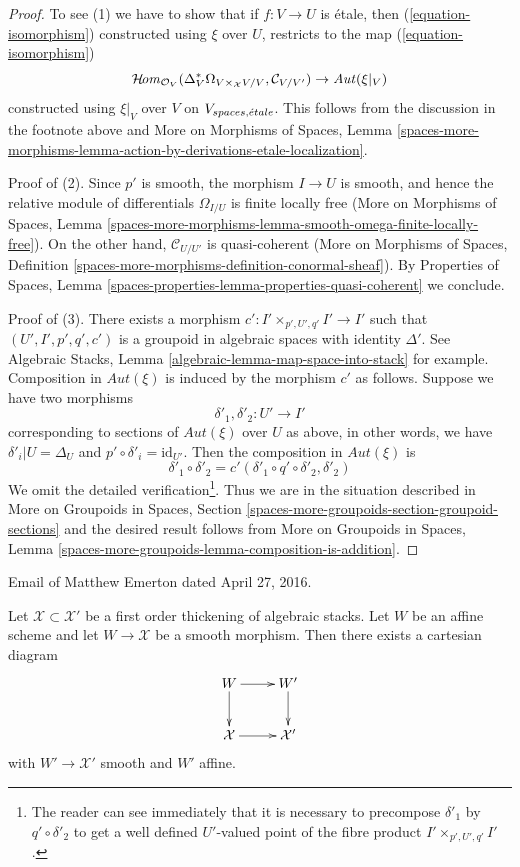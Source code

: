 \begin{proof}
\medskip\noindent
To see (1) we have to show that if $f : V \to U$ is \'etale,
then (\ref{equation-isomorphism}) constructed using $\xi$ over $U$,
restricts to the map (\ref{equation-isomorphism})
$$
\mathop{\mathcal{H}\!\mathit{om}}\nolimits_{\mathcal{O}_V}(
\Delta_V^*\Omega_{V \times_\mathcal{X} V/V}, \mathcal{C}_{V/V'}) \to
\mathit{Aut}(\xi|_V)
$$
constructed using $\xi|_V$ over $V$ on $V_{spaces, {\acute{e}tale}}$.
This follows from the discussion in the footnote above
and More on Morphisms of Spaces, Lemma
\ref{spaces-more-morphisms-lemma-action-by-derivations-etale-localization}.

\medskip\noindent
Proof of (2). Since $p'$ is smooth, the morphism $I \to U$ is smooth,
and hence the relative module of differentials $\Omega_{I/U}$
is finite locally free (More on Morphisms of Spaces, Lemma
\ref{spaces-more-morphisms-lemma-smooth-omega-finite-locally-free}).
On the other hand, $\mathcal{C}_{U/U'}$ is quasi-coherent
(More on Morphisms of Spaces, Definition
\ref{spaces-more-morphisms-definition-conormal-sheaf}).
By Properties of Spaces, Lemma
\ref{spaces-properties-lemma-properties-quasi-coherent}
we conclude.

\medskip\noindent
Proof of (3). There exists a morphism $c' : I' \times_{p', U', q'} I' \to I'$
such that $(U', I', p', q', c')$ is a groupoid in algebraic spaces
with identity $\Delta'$. See
Algebraic Stacks, Lemma \ref{algebraic-lemma-map-space-into-stack} for example.
Composition in $\mathit{Aut}(\xi)$ is induced by the morphism
$c'$ as follows. Suppose we have two morphisms
$$
\delta'_1, \delta'_2 : U' \longrightarrow I'
$$
corresponding to sections of $\mathit{Aut}(\xi)$ over $U$ as above,
in other words, we have $\delta'_i|U = \Delta_U$ and
$p' \circ \delta'_i = \text{id}_{U'}$. Then the composition
in $\mathit{Aut}(\xi)$ is
$$
\delta'_1 \circ \delta'_2 = c'(\delta'_1 \circ q' \circ \delta'_2, \delta'_2)
$$
We omit the detailed verification\footnote{The reader can see immediately
that it is necessary to precompose
$\delta'_1$ by $q' \circ \delta'_2$ to get a well defined $U'$-valued
point of the fibre product $I' \times_{p', U', q'} I'$.}.
Thus we are in the situation described in
More on Groupoids in Spaces, Section
\ref{spaces-more-groupoids-section-groupoid-sections}
and the desired result follows from
More on Groupoids in Spaces, Lemma
\ref{spaces-more-groupoids-lemma-composition-is-addition}.
\end{proof}

\begin{proposition}[Emerton]
\label{proposition-affine-smooth-lift-to-first-order}
\begin{reference}
Email of Matthew Emerton dated April 27, 2016.
\end{reference}
Let $\mathcal{X} \subset \mathcal{X}'$ be a first order thickening
of algebraic stacks. Let $W$ be an affine scheme and let
$W \to \mathcal{X}$ be a smooth morphism. Then there exists
a cartesian diagram
$$
\xymatrix{
W \ar[d] \ar[r] & W' \ar[d] \\
\mathcal{X} \ar[r] & \mathcal{X}'
}
$$
with $W' \to \mathcal{X}'$ smooth and $W'$ affine.
\end{proposition}

